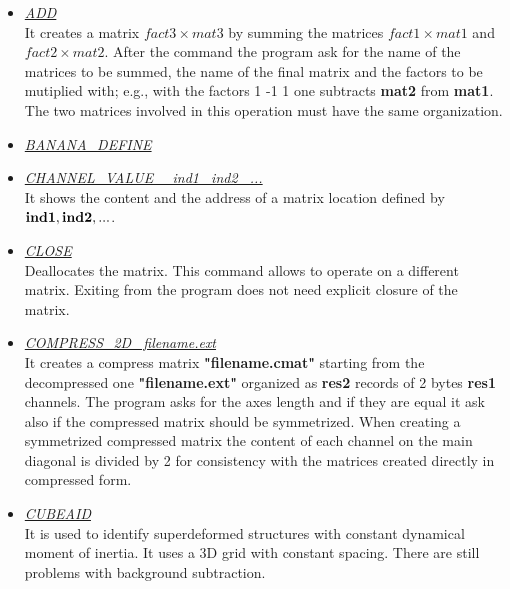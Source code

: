 \bigskip
\bigskip     

\begin{itemize}

 \item	{\it\underline{ADD}} \\

	It creates a matrix {\bf $fact3 \times mat3$} by summing the matrices 
	{\bf $fact1 \times mat1$} and {\bf $fact2 \times mat2$}. After the
	command the program ask for the name of the matrices to be summed, the 
	name of the final matrix and the factors to be mutiplied with; e.g.,
	with the factors 1 -1 1 one subtracts {\bf mat2} from {\bf mat1}. The
	two matrices involved in this operation must have the same
	organization.

 \item	{\it\underline{BANANA\_DEFINE}} \\



 \item	{\it\underline{CHANNEL\_VALUE ~~ind1 ~ind2 ~...}} \\

	It shows the content and the address of a matrix location defined by
	${\bf ind1, ind2, ...}$.

 \item	{\it\underline{CLOSE}} \\

	Deallocates the matrix. This command allows to operate on a different
	matrix. Exiting from the program does not need explicit closure of the
	matrix.

 \item	{\it\underline{COMPRESS\_2D ~filename.ext}} \\

	It creates a compress matrix {\bf "filename.cmat"} starting from the
	decompressed one {\bf "filename.ext"} organized as {\bf res2} records
	of 2 bytes {\bf res1} channels. The program asks for the axes length
	and if they are equal it ask also if the compressed matrix should be
	symmetrized. When creating a symmetrized compressed matrix the content
	of each channel on the main diagonal is divided by 2 for consistency
	with the matrices created directly in compressed form.

 \item	{\it\underline{CUBEAID}} \\

	It is used to identify superdeformed structures with constant dynamical
	moment of inertia. It uses a 3D grid with constant spacing. There are 
	still problems with background subtraction.


\end{itemize}
